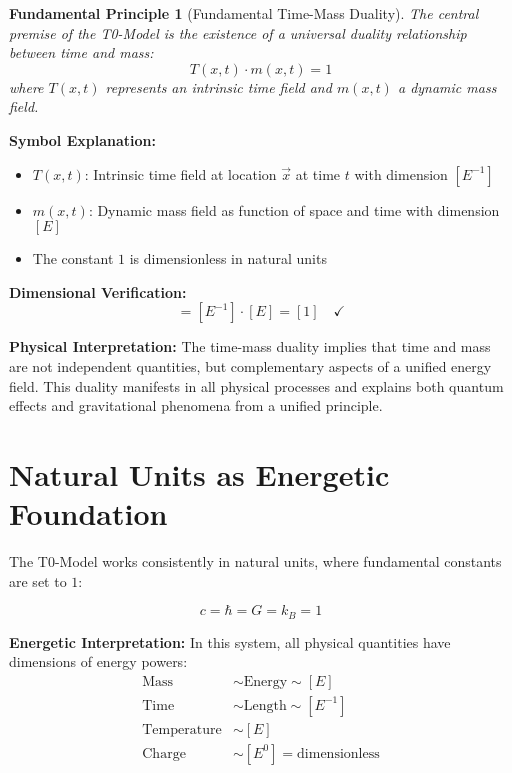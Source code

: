 \documentclass[12pt,a4paper]{report}
\newcommand{\Tfield}{T(x,t)}  %
\newcommand{\mfield}{m(x,t)}  %
\newcommand{\vecx}{\vec{x}}                 %
\newtheorem{principle}{Fundamental Principle}[chapter]
\begin{document}
\begin{principle}[Fundamental Time-Mass Duality]\label{principle:time_mass_duality}
	The central premise of the T0-Model is the existence of a universal duality relationship between time and mass:
	\begin{equation}\label{eq:time_mass_duality}
		\Tfield \cdot \mfield = 1
	\end{equation}
	where $\Tfield$ represents an intrinsic time field and $\mfield$ a dynamic mass field.
\end{principle}

\textbf{Symbol Explanation:}
\begin{itemize}
	\item $\Tfield$: Intrinsic time field at location $\vecx$ at time $t$ with dimension $[E^{-1}]$
	\item $\mfield$: Dynamic mass field as function of space and time with dimension $[E]$  
	\item The constant $1$ is dimensionless in natural units
\end{itemize}

\textbf{Dimensional Verification:}
\begin{equation}
	[\Tfield \cdot \mfield] = [E^{-1}] \cdot [E] = [1] \quad \checkmark
\end{equation}

\textbf{Physical Interpretation:}
The time-mass duality implies that time and mass are not independent quantities, but complementary aspects of a unified energy field. This duality manifests in all physical processes and explains both quantum effects and gravitational phenomena from a unified principle.

\section{Natural Units as Energetic Foundation}\label{sec:natural_units}

The T0-Model works consistently in natural units, where fundamental constants are set to $1$:

\begin{equation}
	c = \hbar = G = k_B = 1
\end{equation}

\textbf{Energetic Interpretation:}
In this system, all physical quantities have dimensions of energy powers:
\begin{align}
	\text{Mass} &\sim \text{Energy} \sim [E] \\
	\text{Time} &\sim \text{Length} \sim [E^{-1}] \\
	\text{Temperature} &\sim [E] \\
	\text{Charge} &\sim [E^0] = \text{dimensionless}
\end{align}
\end{document}
